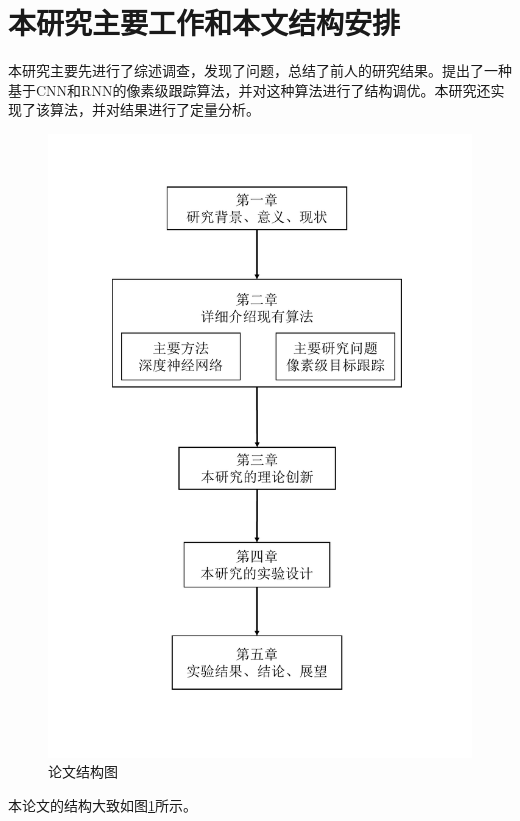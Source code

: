 \newpage
\section{本研究主要工作和本文结构安排}
本研究主要先进行了综述调查，发现了问题，总结了前人的研究结果。提出了一种基于CNN和RNN的像素级跟踪算法，并对这种算法进行了结构调优。本研究还实现了该算法，并对结果进行了定量分析。

\par
\begin{figure}[htbp!]
    \centering
    \includegraphics[width = 8\textwidth]{chap/img/thesis_structure.pdf}
    \caption{论文结构图}
    \label{fig:thesis_structure}
\end{figure}
\par
本论文的结构大致如图\ref{fig:thesis_structure}所示。